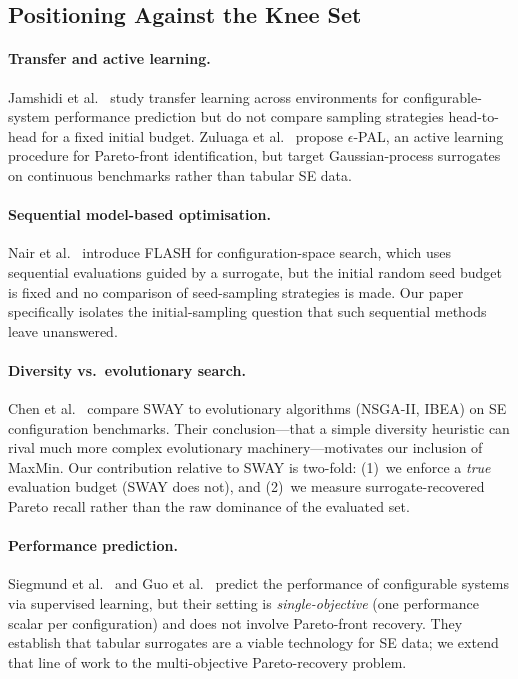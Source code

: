 \documentclass[sigconf,nonacm]{acmart}
\begin{document}
\subsection{Positioning Against the Knee Set}

\paragraph{Transfer and active learning.}
Jamshidi et al.~\cite{jamshidi2018learning} study transfer learning across
environments for configurable-system performance prediction but do not
compare sampling strategies head-to-head for a fixed initial budget.
Zuluaga et al.~\cite{zuluaga2013active} propose $\epsilon$-PAL, an active
learning procedure for Pareto-front identification, but target
Gaussian-process surrogates on continuous benchmarks rather than tabular SE
data.

\paragraph{Sequential model-based optimisation.}
Nair et al.~\cite{nair2018finding} introduce FLASH for configuration-space
search, which uses sequential evaluations guided by a surrogate, but the
initial random seed budget is fixed and no comparison of seed-sampling
strategies is made.
Our paper specifically isolates the initial-sampling question that such
sequential methods leave unanswered.

\paragraph{Diversity vs.\ evolutionary search.}
Chen et al.~\cite{chen2019sampling} compare SWAY to evolutionary algorithms
(NSGA-II, IBEA) on SE configuration benchmarks.
Their conclusion---that a simple diversity heuristic can rival much more
complex evolutionary machinery---motivates our inclusion of MaxMin.
Our contribution relative to SWAY is two-fold:
(1)~we enforce a \emph{true} evaluation budget (SWAY does not), and
(2)~we measure surrogate-recovered Pareto recall rather than the raw
dominance of the evaluated set.

\paragraph{Performance prediction.}
Siegmund et al.~\cite{siegmund2012predicting} and Guo et
al.~\cite{guo2018data} predict the performance of configurable systems via
supervised learning, but their setting is \emph{single-objective} (one
performance scalar per configuration) and does not involve Pareto-front
recovery.
They establish that tabular surrogates are a viable technology for SE data;
we extend that line of work to the multi-objective Pareto-recovery problem.
\end{document}
